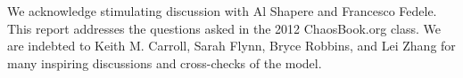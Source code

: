 \begin{acknowledgments}
We acknowledge stimulating discussion with
Al Shapere
and
Francesco Fedele.
This report addresses the questions asked in
the 2012 ChaosBook.org class.
We are indebted to
Keith M. Carroll,
Sarah Flynn,
Bryce Robbins,
and
Lei Zhang
for many inspiring discussions and cross-checks of the model.
\end{acknowledgments}
